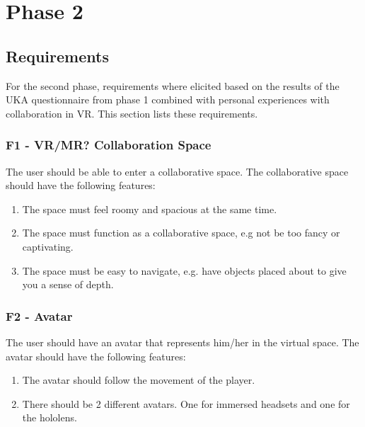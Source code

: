 \chapter{Phase 2}
    \label{chapter:phase2}
    \section{Requirements}
    For the second phase, requirements where elicited based on the results of the UKA questionnaire from phase 1 combined with personal experiences with collaboration in VR. This section lists these requirements.
    
    
        \subsection{F1 - VR/MR? Collaboration Space}
        The user should be able to enter a collaborative space. The collaborative space should have the following features:
        \begin{enumerate}
            \item The space must feel roomy and spacious at the same time.
            \item The space must function as a collaborative space, e.g not be too fancy or captivating.  
            \item The space must be easy to navigate, e.g. have objects placed about to give you a sense of depth.
        \end{enumerate}
        
        \subsection{F2 - Avatar}
        The user should have an avatar that represents him/her in the virtual space. The avatar should have the following features:
        \begin{enumerate}
            \item The avatar should follow the movement of the player. 
            \item There should be 2 different avatars. One for immersed headsets and one for the hololens.
        \end{enumerate}
        
